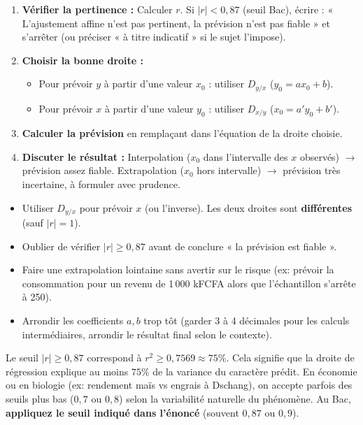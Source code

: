 \documentclass[11pt]{article}
\begin{document}
\begin{methode}
\begin{enumerate}
  \item \textbf{Vérifier la pertinence :} Calculer $r$. Si $|r| < 0,87$ (seuil Bac), écrire : « L'ajustement affine n'est pas pertinent, la prévision n'est pas fiable » et s'arrêter (ou préciser « à titre indicatif » si le sujet l'impose).
  \item \textbf{Choisir la bonne droite :}
  \begin{itemize}
    \item Pour prévoir $y$ à partir d'une valeur $x_0$ : utiliser $D_{y/x}$ ($y_0 = ax_0 + b$).
    \item Pour prévoir $x$ à partir d'une valeur $y_0$ : utiliser $D_{x/y}$ ($x_0 = a'y_0 + b'$).
  \end{itemize}
  \item \textbf{Calculer la prévision} en remplaçant dans l'équation de la droite choisie.
  \item \textbf{Discuter le résultat :} Interpolation ($x_0$ dans l'intervalle des $x$ observés) $\rightarrow$ prévision assez fiable. Extrapolation ($x_0$ hors intervalle) $\rightarrow$ prévision très incertaine, à formuler avec prudence.
\end{enumerate}
\end{methode}

\begin{attention}
\begin{itemize}
  \item Utiliser $D_{y/x}$ pour prévoir $x$ (ou l'inverse). Les deux droites sont \textbf{différentes} (sauf $|r|=1$).
  \item Oublier de vérifier $|r| \ge 0,87$ avant de conclure « la prévision est fiable ».
  \item Faire une extrapolation lointaine sans avertir sur le risque (ex: prévoir la consommation pour un revenu de 1\,000 kFCFA alors que l'échantillon s'arrête à 250).
  \item Arrondir les coefficients $a,b$ trop tôt (garder 3 à 4 décimales pour les calculs intermédiaires, arrondir le résultat final selon le contexte).
\end{itemize}
\end{attention}

\begin{savaistu}
Le seuil $|r|\ge 0,87$ correspond à $r^2 \ge 0,7569 \approx 75\%$. Cela signifie que la droite de régression explique au moins $75\%$ de la variance du caractère prédit. En économie ou en biologie (ex: rendement maïs vs engrais à Dschang), on accepte parfois des seuils plus bas ($0,7$ ou $0,8$) selon la variabilité naturelle du phénomène. Au Bac, \textbf{appliquez le seuil indiqué dans l'énoncé} (souvent $0,87$ ou $0,9$).
\end{savaistu}
\end{document}
